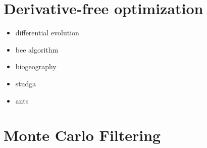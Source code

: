 \documentclass[letterpaper,10pt,english]{sphinxmanual}
\begin{document}
\chapter{Derivative-free optimization}
\label{derivative_free_optimization:derivative-free-optimization}\label{derivative_free_optimization::doc}\begin{itemize}
\item {} 
differential evolution

\item {} 
bee algorithm

\item {} 
biogeography

\item {} 
studga

\item {} 
ants

\end{itemize}


\chapter{Monte Carlo Filtering}
\label{classes/utils/@mcf/mcf:monte-carlo-filtering}\label{classes/utils/@mcf/mcf::doc}
\end{document}
